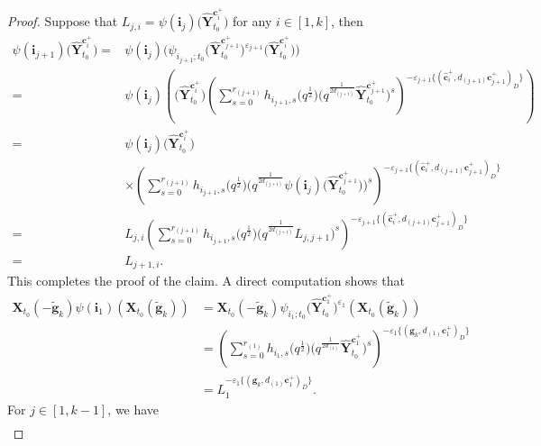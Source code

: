 \documentclass[pdftex]{sigma}
\numberwithin{equation}{section}
\begin{document}
\begin{proof}
 Suppose that $L_{j,i}=\psi(\mathbf{i}_{j})\bigl(\mathbf{\hat{Y}}_{t_{0}}^{\mathbf{c}_{i}^{+}}\bigr)$ for any $i\in[1,k]$, then
 \begin{align*}
 \psi(\mathbf{i}_{j+1})\bigl(\mathbf{\hat{Y}}_{t_{0}}^{\mathbf{c}_{i}^{+}}\bigr)
 ={}&\psi(\mathbf{i}_{j})\bigl(\psi_{i_{j+1};t_{0}}\bigl(\mathbf{\hat{Y}}_{t_{0}}^{\mathbf{c}_{j+1}^{+}}\bigr)^{\varepsilon_{j+1}}\bigl(\mathbf{\hat{Y}}_{t_{0}}^{\mathbf{c}_{i}^{+}}\bigr)\bigr)\\
 ={}&\psi(\mathbf{i}_{j})\left(\bigl(\mathbf{\hat{Y}}_{t_{0}}^{\mathbf{c}_{i}^{+}}\bigr)\left(\sum\limits^{r_{(j+1)}}_{s=0}h_{i_{j+1},s}
 \bigl(q^{\frac{1}{2}}\bigr)\bigl(q^{\frac{1}{2d_{(j+1)}}}\mathbf{\hat{Y}}_{t_{0}}^{\mathbf{c}_{j+1}^{+}}\bigr)^{s}\right)^{-\varepsilon_{j+1}
 \{(\mathbf{\hat{c}}_{i}^{+},d_{(j+1)}\mathbf{c}_{j+1}^{+})_{D}\}}\right)\\
 ={}&\psi(\mathbf{i}_{j})\bigl(\mathbf{\hat{Y}}_{t_{0}}^{\mathbf{c}_{i}^{+}}\bigr)\\
 &\times\left(\sum\limits^{r_{(j+1)}}_{s=0}h_{i_{j+1},s}\bigl(q^{\frac{1}{2}}\bigr)
 \bigl(q^{\frac{1}{2d_{(j+1)}}}\psi(\mathbf{i}_{j})\bigl(\mathbf{\hat{Y}}_{t_{0}}^{\mathbf{c}_{j+1}^{+}}\bigr)\bigr)^{s}\right)^{-\varepsilon_{j+1}\{(\mathbf{\hat{c}}_{i}^{+},d_{(j+1)}\mathbf{c}_{j+1}^{+})_{D}\}}\\
 ={}&L_{j,i}\left(\sum\limits^{r_{(j+1)}}_{s=0}h_{i_{j+1},s}\bigl(q^{\frac{1}{2}}\bigr)\bigl(q^{\frac{1}{2d_{(j+1)}}}L_{j,j+1}\bigr)^{s}\right)^{-\varepsilon_{j+1}
 \{(\mathbf{\hat{c}}_{i}^{+},d_{(j+1)}\mathbf{c}_{j+1}^{+})_{D}\}}\\
 ={}&L_{j+1,i}.
 \end{align*}
 This completes the proof of the claim.
 A direct computation shows that
 \begin{align*}
 \mathbf{X}_{t_0}(-\mathbf{\tilde{g}}_{k})\psi(\mathbf{i}_{1})(\mathbf{X}_{t_0}(\mathbf{\tilde{g}}_{k}))
 &=\mathbf{X}_{t_0}(-\mathbf{\tilde{g}}_{k})\psi_{i_{1};t_{0}}\bigl(\mathbf{\hat{Y}}_{t_{0}}^{\mathbf{c}_{1}^{+}}\bigr)^{\varepsilon_{1}}(\mathbf{X}_{t_0}(\mathbf{\tilde{g}}_{k}))\\
 &=\left(\sum\limits^{r_{(1)}}_{s=0}h_{i_{1},s}\bigl(q^{\frac{1}{2}}\bigr)\bigl(q^{\frac{1}{2d_{(1)}}}\mathbf{\hat{Y}}_{t_{0}}^{\mathbf{c}_{1}^{+}}\bigr)^{s}\right)^{-\varepsilon_{1}\{(\mathbf{g}_{k},d_{(1)}\mathbf{c}_{1}^{+})_{D}\}}\\
 &=L_{1}^{-\varepsilon_{1}\{(\mathbf{g}_{k},d_{(1)}\mathbf{c}_{1}^{+})_{D}\}}.
 \end{align*}
 For $j\in[1,k-1]$, we have
 \begin{gather*}

\end{gather*}
\end{proof}
\end{document}
